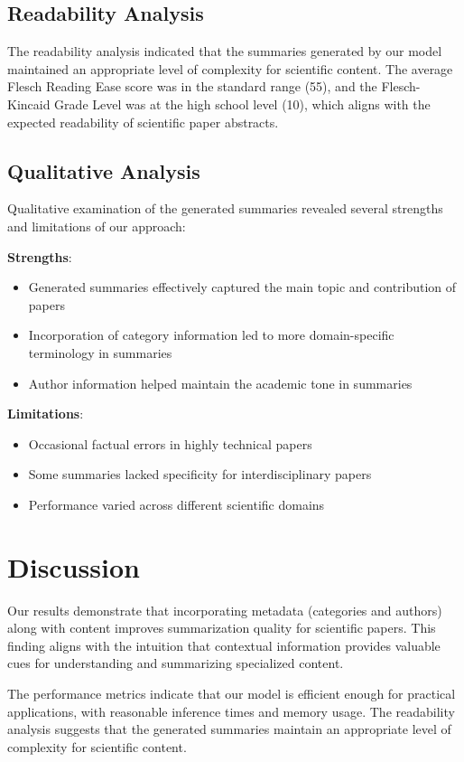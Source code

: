\documentclass[conference]{IEEEtran}
\begin{document}
\subsection{Readability Analysis}
The readability analysis indicated that the summaries generated by our model maintained an appropriate level of complexity for scientific content. The average Flesch Reading Ease score was in the standard range (55), and the Flesch-Kincaid Grade Level was at the high school level (10), which aligns with the expected readability of scientific paper abstracts.

\subsection{Qualitative Analysis}
Qualitative examination of the generated summaries revealed several strengths and limitations of our approach:

\textbf{Strengths}:
\begin{itemize}
\item Generated summaries effectively captured the main topic and contribution of papers
\item Incorporation of category information led to more domain-specific terminology in summaries
\item Author information helped maintain the academic tone in summaries
\end{itemize}

\textbf{Limitations}:
\begin{itemize}
\item Occasional factual errors in highly technical papers
\item Some summaries lacked specificity for interdisciplinary papers
\item Performance varied across different scientific domains
\end{itemize}

\section{Discussion}
Our results demonstrate that incorporating metadata (categories and authors) along with content improves summarization quality for scientific papers. This finding aligns with the intuition that contextual information provides valuable cues for understanding and summarizing specialized content.

The performance metrics indicate that our model is efficient enough for practical applications, with reasonable inference times and memory usage. The readability analysis suggests that the generated summaries maintain an appropriate level of complexity for scientific content.
\end{document}
